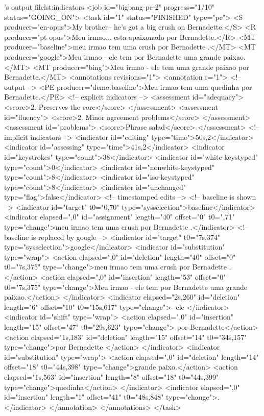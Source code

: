 \begin{workflow-code}{\PET's output file}{lst:indicators}
<job id="bigbang-pe-2" progress="1/10" status="GOING_ON">
  <task id="1" status="FINISHED" type="pe">
    <S producer="en-opus">My brother-- he's got a big crush on Bernadette.</S>
    <R producer="pt-opus">Meu irmao... esta apaixonado por Bernadette.</R>
    <MT producer="baseline">meu irmao tem uma crush por Bernadette .</MT>
    <MT producer="google">Meu irmao - ele tem por Bernadette uma grande paixao.</MT>
    <MT producer="bing">Meu irmao - ele tem uma grande paixao por Bernadette.</MT>
    <annotations revisions="1">
      <annotation r="1">
        <!-- output -->
        <PE producer="demo.baseline">Meu irmao tem uma quedinha por Bernadette.</PE>
        <!-- explicit indicators -->
        <assessment id="adequacy">
          <score>2. Preserves the core</score>
        </assessment>
        <assessment id="fluency">
          <score>2. Minor agreement problems</score>
        </assessment>
        <assessment id="problems">
          <score>Phrase salad</score>
        </assessment>
        <!-- implicit indicators -->
        <indicator id="editing" type="time">50s,2</indicator>
        <indicator id="assessing" type="time">41s,2</indicator>
        <indicator id="keystrokes" type="count">38</indicator>
        <indicator id="white-keystyped" type="count">0</indicator>
        <indicator id="nonwhite-keystyped" type="count">8</indicator>
        <indicator id="iso-keystyped" type="count">8</indicator>
        <indicator id="unchanged" type="flag">false</indicator>
        <!-- timestamped edits -->
        <!-- baseline is shown -->
        <indicator id="target" t0="0,70" type="sysselection">baseline</indicator>
        <indicator elapsed=",0" id="assignment" length="40" offset="0" t0=",71" type="change">meu irmao tem uma crush por Bernadette .</indicator>
        <!-- baseline is replaced by google -->
        <indicator id="target" t0="7s,374" type="sysselection">google</indicator>
        <indicator id="substitution" type="wrap">
          <action elapsed=",0" id="deletion" length="40" offset="0" t0="7s,375" type="change">meu irmao tem uma crush por Bernadette .</action>
          <action elapsed=",0" id="insertion" length="53" offset="0" t0="7s,375" type="change">Meu irmao - ele tem por Bernadette uma grande paixao.</action>
        </indicator>
        <indicator elapsed="2s,260" id="deletion" length="6" offset="10" t0="15s,617" type="change">- ele </indicator>
        <indicator id="shift" type="wrap">
          <action elapsed=",0" id="insertion" length="15" offset="47" t0="29s,623" type="change"> por Bernadette</action>
          <action elapsed="1s,183" id="deletion" length="15" offset="14" t0="34s,157" type="change">por Bernadette </action>
        </indicator>
        <indicator id="substitution" type="wrap">
          <action elapsed=",0" id="deletion" length="14" offset="18" t0="44s,398" type="change">grande paixo.</action>
          <action elapsed="1s,563" id="insertion" length="8" offset="18" t0="44s,399" type="change">quedinha</action>
        </indicator>
        <indicator elapsed=",0" id="insertion" length="1" offset="41" t0="48s,848" type="change">.</indicator>
      </annotation>
    </annotations>
  </task>
\end{workflow-code}

